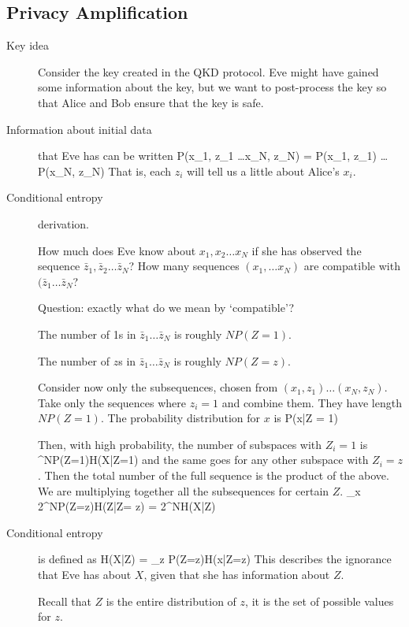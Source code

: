 \subsection{Privacy Amplification}
\begin{description}

\item[Key idea] Consider the key created in the QKD protocol. Eve might have gained some information about the key, but we want to post-process the key so that Alice and Bob ensure that the key is safe. 

\item[Information about initial data] that Eve has can be written 
\beq
P(x_1, z_1 \ldots x_N, z_N) = P(x_1, z_1) \ldots P(x_N, z_N)
\eeq
That is, each $z_i$ will tell us a little about Alice's $x_i$. 

\item[Conditional entropy] derivation. 

How much does Eve know about $x_1, x_2\ldots x_N$ if she has observed the sequence $\bar{z}_1, \bar{z}_2 \ldots \bar{z}_N$? How many sequences $(x_1,\ldots x_N)$ are compatible with $(\bar{z}_1 \ldots \bar{z}_N$? 

Question: exactly what do we mean by `compatible'? 

The number of 1s in $\bar{z}_1 \ldots \bar{z}_N$ is roughly $NP(Z=1)$. 

The number of $z$s in $\bar{z}_1 \ldots \bar{z}_N$ is roughly $NP(Z= z)$. 

Consider now only the subsequences, chosen from $(x_1, z_1) \ldots (x_N, z_N)$. Take only the sequences where $z_i = 1$ and combine them. They have length $NP(Z = 1)$. The probability distribution for $x$ is 
\beq
P(x|Z = 1)
\eeq

Then, with high probability, the number of subspaces with $Z_i = 1$ is
^{NP(Z=1)H(X|Z=1)}
\eeq
and the same goes for any other subspace with $Z_i = z$. Then the total number of the full sequence is the product of the above. We are multiplying together all the subsequences for certain $Z$. 
\beq
\prod_x 2^{NP(Z=z)H(Z|Z= z)} = 2^{NH(X|Z)}
\eeq

\item[Conditional entropy] is defined as
\beq
H(X|Z) = \sum_z P(Z=z)H(x|Z=z)
\eeq
This describes the ignorance that Eve has about $X$, given that she has information about $Z$. 

Recall that $Z$ is the entire distribution of $z$, it is the set of possible values for $z$.


\end{description}
